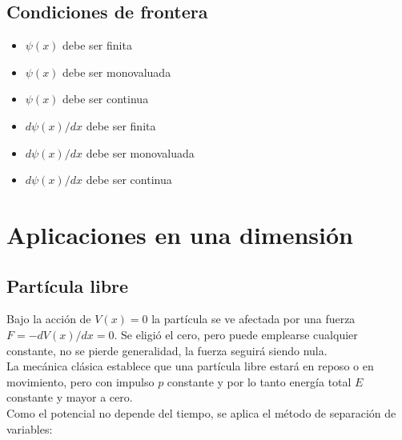 \documentclass[oneside]{book}
\numberwithin{equation}{section}
\numberwithin{figure}{section}
\numberwithin{table}{section}
\begin{document}
			\subsection{Condiciones de frontera}
						
				\begin{minipage}[t]{0.5\textwidth}
					\begin{itemize}
						\item $\psi(x)$ debe ser finita
						\item $\psi(x)$ debe ser monovaluada
						\item $\psi(x)$ debe ser continua\\
					\end{itemize}
				\end{minipage}
				\begin{minipage}[t]{0.5\textwidth}
					\begin{itemize}
						\item $d\psi(x)/dx$ debe ser finita
						\item $d\psi(x)/dx$ debe ser monovaluada
						\item $d\psi(x)/dx$ debe ser continua
					\end{itemize}
				\end{minipage}
			
		\section{Aplicaciones en una dimensión}
				\subsection{Partícula libre}
				
					Bajo la acción de $V(x)=0$ la partícula se ve afectada por una fuerza $F=-dV(x)/dx=0$. Se eligió el cero, pero puede emplearse cualquier constante, no se pierde generalidad, la fuerza seguirá siendo nula.\\
					
					La mecánica clásica establece que una partícula libre estará en reposo o en movimiento, pero con impulso $p$ constante y por lo tanto energía total $E$ constante y mayor a cero.\\
					
					Como el potencial no depende del tiempo, se aplica el método de separación de variables: 
					
\end{document}
